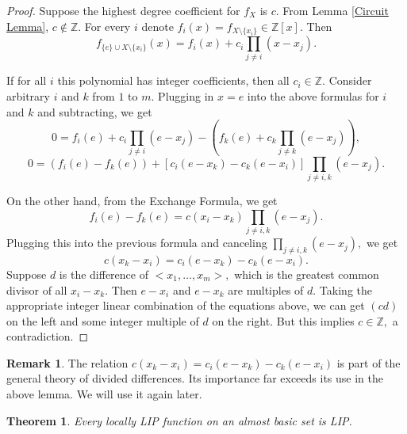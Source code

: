 \documentclass[10pt]{article}
\newtheorem{theorem}{Theorem}
\theoremstyle{definition}
\newtheorem{remark}{Remark}
\begin{document}
\begin{proof} Suppose the highest degree coefficient for $f_X$ is $c.$ From Lemma \ref{Circuit Lemma}, $c\notin \mathbb Z.$ For every $i$ denote $f_i(x)=f_{X\setminus \{x_i\}} \in \mathbb Z[x].$  Then 
$$f_{\{e\}\cup X\setminus \{x_i\}}(x)=f_i(x)+c_i\prod \limits_{j\neq i} (x-x_j).$$

If for all $i$ this polynomial has integer coefficients, then all $c_i\in \mathbb Z.$ Consider arbitrary $i$ and $k$ from $1$ to $m.$ Plugging in $x=e$ into the above formulas for $i$ and $k$ and subtracting, we get 
$$0=f_i(e)+c_i\prod \limits_{j\neq i} (e-x_j)-(f_k(e)+c_k\prod \limits_{j\neq k} (e-x_j)),$$
$$0=(f_i(e)-f_k(e))+[c_i(e-x_k)-c_k(e-x_i)]\prod \limits_{j\neq i,k} (e-x_j).$$

On the other hand, from the Exchange Formula, we get
$$f_i(e)-f_k(e)=c(x_i-x_k)\prod \limits_{j\neq i,k} (e-x_j).$$
Plugging this into the previous formula and canceling $\prod \limits_{j\neq i,k} (e-x_j),$ we get
$$c(x_k-x_i)=c_i(e-x_k)-c_k(e-x_i).$$
Suppose $d$ is the difference of $<x_1,\dots,x_m>,$ which is the greatest common divisor of all $x_i-x_k.$  Then $e-x_i$ and $e-x_k$ are multiples of $d.$ Taking the appropriate integer linear combination of the equations above, we can get $(cd)$ on the left and some integer multiple of $d$ on the right. But this implies $c\in \mathbb Z,$ a contradiction.
\end{proof}

\begin{remark} \label{DivDiff3}The relation $c(x_k-x_i)=c_i(e-x_k)-c_k(e-x_i)$ is part of the general theory of divided differences. Its importance far exceeds its use in the above lemma. We will use it again later. 
\end{remark}

\begin{theorem} \label{Tmain+} Every locally LIP function on an almost basic set is LIP.
\end{theorem}
\end{document}
